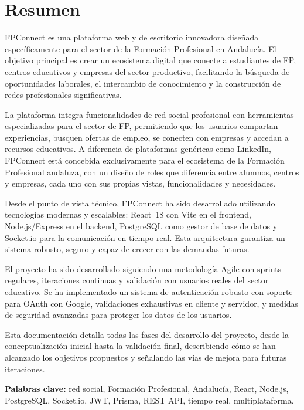\documentclass[a4paper]{report}
\begin{document}
\chapter*{Resumen}

FPConnect es una plataforma web y de escritorio innovadora diseñada específicamente para el sector de la Formación Profesional en Andalucía. El objetivo principal es crear un ecosistema digital que conecte a estudiantes de FP, centros educativos y empresas del sector productivo, facilitando la búsqueda de oportunidades laborales, el intercambio de conocimiento y la construcción de redes profesionales significativas.

La plataforma integra funcionalidades de red social profesional con herramientas especializadas para el sector de FP, permitiendo que los usuarios compartan experiencias, busquen ofertas de empleo, se conecten con empresas y accedan a recursos educativos. A diferencia de plataformas genéricas como LinkedIn, FPConnect está concebida exclusivamente para el ecosistema de la Formación Profesional andaluza, con un diseño de roles que diferencia entre alumnos, centros y empresas, cada uno con sus propias vistas, funcionalidades y necesidades.

Desde el punto de vista técnico, FPConnect ha sido desarrollado utilizando tecnologías modernas y escalables: React~18 con Vite en el frontend, Node.js/Express en el backend, PostgreSQL como gestor de base de datos y Socket.io para la comunicación en tiempo real. Esta arquitectura garantiza un sistema robusto, seguro y capaz de crecer con las demandas futuras.

El proyecto ha sido desarrollado siguiendo una metodología Agile con sprints regulares, iteraciones continuas y validación con usuarios reales del sector educativo. Se ha implementado un sistema de autenticación robusto con soporte para OAuth con Google, validaciones exhaustivas en cliente y servidor, y medidas de seguridad avanzadas para proteger los datos de los usuarios.

Esta documentación detalla todas las fases del desarrollo del proyecto, desde la conceptualización inicial hasta la validación final, describiendo cómo se han alcanzado los objetivos propuestos y señalando las vías de mejora para futuras iteraciones.

\bigskip
\noindent\textbf{Palabras clave:} red social, Formación Profesional, Andalucía, React, Node.js, PostgreSQL, Socket.io, JWT, Prisma, REST API, tiempo real, multiplataforma.
\end{document}

